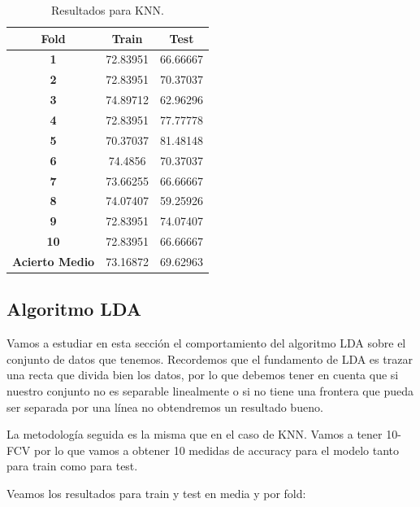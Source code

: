 \documentclass[12pt,a4paper]{article}
\begin{document}
\begin{table}[H]
	\centering
	\begin{tabular}{|c|c|c|}
		\hline
		\textbf{Fold}          & \textbf{Train} & \textbf{Test} \\ \hline
		\textbf{1}             & 72.83951       & 66.66667      \\ \hline
		\textbf{2}             & 72.83951       & 70.37037      \\ \hline
		\textbf{3}             & 74.89712       & 62.96296      \\ \hline
		\textbf{4}             & 72.83951       & 77.77778      \\ \hline
		\textbf{5}             & 70.37037       & 81.48148      \\ \hline
		\textbf{6}             & 74.4856        & 70.37037      \\ \hline
		\textbf{7}             & 73.66255       & 66.66667      \\ \hline
		\textbf{8}             & 74.07407       & 59.25926      \\ \hline
		\textbf{9}             & 72.83951       & 74.07407      \\ \hline
		\textbf{10}            & 72.83951       & 66.66667      \\ \hline
		\textbf{Acierto Medio} & 73.16872       & 69.62963      \\ \hline
	\end{tabular}
	\caption{Resultados para KNN.}
\end{table}

\subsection{Algoritmo LDA}

Vamos a estudiar en esta sección el comportamiento del algoritmo LDA sobre el conjunto de datos que tenemos. Recordemos que el fundamento de LDA es trazar una recta que divida bien los datos, por lo que debemos tener en cuenta que si nuestro conjunto no es separable linealmente o si no tiene una frontera que pueda ser separada por una línea no obtendremos un resultado bueno.

La metodología seguida es la misma que en el caso de KNN. Vamos a tener 10-FCV por lo que vamos a obtener 10 medidas de accuracy para el modelo tanto para train como para test.

Veamos los resultados para train y test en media y por fold:
\end{document}

